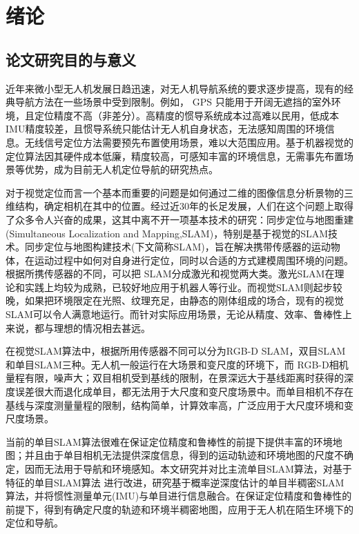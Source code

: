
\chapter{绪论}
\label{chap:intro}

\section{论文研究目的与意义}
近年来微小型无人机发展日趋迅速，对无人机导航系统的要求逐步提高，现有的经典导航方法在一些场景中受到限制。例如， GPS 只能用于开阔无遮挡的室外环境，且定位精度不高（非差分）。高精度的惯导系统成本过高难以民用，低成本IMU精度较差，且惯导系统只能估计无人机自身状态，无法感知周围的环境信息。无线信号定位方法需要预先布置使用场景，难以大范围应用。基于机器视觉的定位算法因其硬件成本低廉，精度较高，可感知丰富的环境信息，无需事先布置场景等优势，成为目前无人机定位导航的研究热点。

对于视觉定位而言一个基本而重要的问题是如何通过二维的图像信息分析景物的三维结构，确定相机在其中的位置。经过近30年的长足发展，人们在这个问题上取得了众多令人兴奋的成果，这其中离不开一项基本技术的研究：同步定位与地图重建(Simultaneous Localization and Mapping,SLAM)，特别是基于视觉的SLAM技术。同步定位与地图构建技术(下文简称SLAM)，旨在解决携带传感器的运动物体，在运动过程中如何对自身进行定位，同时以合适的方式建模周围环境的问题。根据所携传感器的不同，可以把 SLAM分成激光和视觉两大类。激光SLAM在理论和实践上均较为成熟，已较好地应用于机器人等行业。而视觉SLAM则起步较晚，如果把环境限定在光照、纹理充足，由静态的刚体组成的场合，现有的视觉SLAM可以令人满意地运行。而针对实际应用场景，无论从精度、效率、鲁棒性上来说，都与理想的情况相去甚远。

在视觉SLAM算法中，根据所用传感器不同可以分为RGB-D SLAM，双目SLAM和单目SLAM三种。无人机一般运行在大场景和变尺度的环境下，而 RGB-D相机量程有限，噪声大；双目相机受到基线的限制，在景深远大于基线距离时获得的深度误差很大而退化成单目，都无法用于大尺度和变尺度场景中。而单目相机不存在基线与深度测量量程的限制，结构简单，计算效率高，广泛应用于大尺度环境和变尺度场景。

当前的单目SLAM算法很难在保证定位精度和鲁棒性的前提下提供丰富的环境地图；并且由于单目相机无法提供深度信息，得到的运动轨迹和环境地图的尺度不确定，因而无法用于导航和环境感知。本文研究并对比主流单目SLAM算法，对基于特征的单目SLAM算法
进行改进，研究基于概率逆深度估计的单目半稠密SLAM算法，并将惯性测量单元(IMU)与单目进行信息融合。在保证定位精度和鲁棒性的前提下，得到有确定尺度的轨迹和环境半稠密地图，应用于无人机在陌生环境下的定位和导航。
